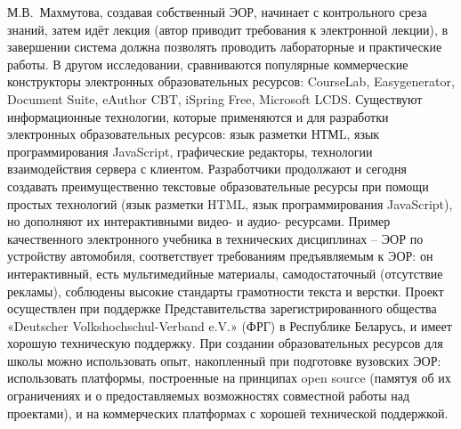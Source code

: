 М.В.~Махмутова, создавая собственный ЭОР, начинает с контрольного среза знаний, затем идёт лекция (автор приводит требования к электронной лекции), в завершении система должна позволять проводить лабораторные и практические работы.
В другом исследовании, сравниваются популярные коммерческие конструкторы электронных образовательных ресурсов: CourseLab, Easygenerator, Document Suite, eAuthor CBT, iSpring Free, Microsoft LCDS.
Существуют информационные технологии, которые применяются и для разработки электронных образовательных ресурсов: язык разметки НТМL, язык программирования JavaScript, графические редакторы, технологии взаимодействия сервера с клиентом\cite{10}.
Разработчики продолжают и сегодня создавать преимущественно текстовые образовательные ресурсы при помощи простых технологий (язык разметки HTML, язык программирования JavaScript)\cite{11}, но дополняют их интерактивными видео- и аудио- ресурсами.
Пример качественного электронного учебника в технических дисциплинах – ЭОР по устройству автомобиля\cite{12}, соответствует требованиям предъявляемым к ЭОР: он интерактивный, есть мультимедийные материалы, самодостаточный (отсутствие рекламы), соблюдены высокие стандарты грамотности текста и верстки.
Проект осуществлен при поддержке Представительства зарегистрированного общества «Deutscher Volkshochschul-Verband e.V.» (ФРГ) в Республике Беларусь, и имеет хорошую техническую поддержку.
При создании образовательных ресурсов для школы можно использовать опыт, накопленный при подготовке вузовских ЭОР: использовать платформы, построенные на принципах open source (памятуя об их ограничениях и о предоставляемых возможностях совместной работы над проектами), и  на коммерческих платформах с хорошей технической поддержкой.

